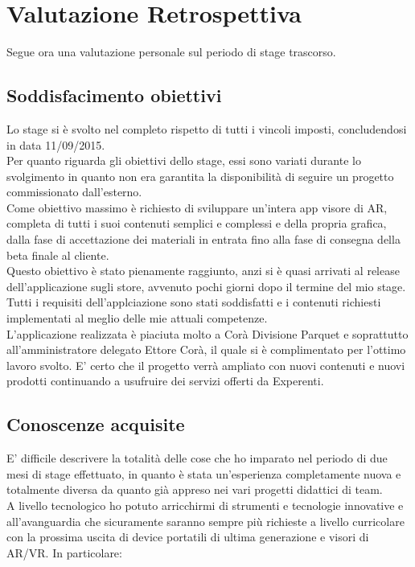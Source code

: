 \section{Valutazione Retrospettiva}
Segue ora una valutazione personale sul periodo di stage trascorso.
\subsection{Soddisfacimento obiettivi}
Lo stage si \`e svolto nel completo rispetto di tutti i vincoli imposti, concludendosi in data 11/09/2015. \\
Per quanto riguarda gli obiettivi dello stage, essi sono variati durante lo svolgimento in quanto non era garantita la disponibilit\`a di seguire un progetto commissionato dall'esterno.\\
Come obiettivo massimo è richiesto di sviluppare un’intera app visore di AR, completa di tutti i suoi contenuti semplici e complessi e della propria grafica, dalla fase di accettazione dei materiali in entrata fino alla fase di consegna della beta finale al cliente.\\
Questo obiettivo \`e stato pienamente raggiunto, anzi si \`e quasi arrivati al release dell'applicazione sugli store, avvenuto pochi giorni dopo il termine del mio stage.\\
Tutti i requisiti dell'applciazione sono stati soddisfatti e i contenuti richiesti implementati al meglio delle mie attuali competenze.\\
L'applicazione realizzata \`e piaciuta molto a Cor\`a Divisione Parquet e soprattutto all'amministratore delegato Ettore Cor\`a, il quale si \`e complimentato per l'ottimo lavoro svolto. E' certo che il progetto verr\`a ampliato con nuovi contenuti e nuovi prodotti continuando a usufruire dei servizi offerti da Experenti.\\
\subsection{Conoscenze acquisite}
E' difficile descrivere la totalit\`a delle cose che ho imparato nel periodo di due mesi di stage effettuato, in quanto \`e stata un'esperienza completamente nuova e totalmente diversa da quanto gi\`a appreso nei vari progetti didattici di team.\\
A livello tecnologico ho potuto arricchirmi di strumenti e tecnologie innovative e all'avanguardia che sicuramente saranno sempre pi\`u richieste a livello curricolare con la prossima uscita di device portatili di ultima generazione e visori di AR/VR. In particolare:

